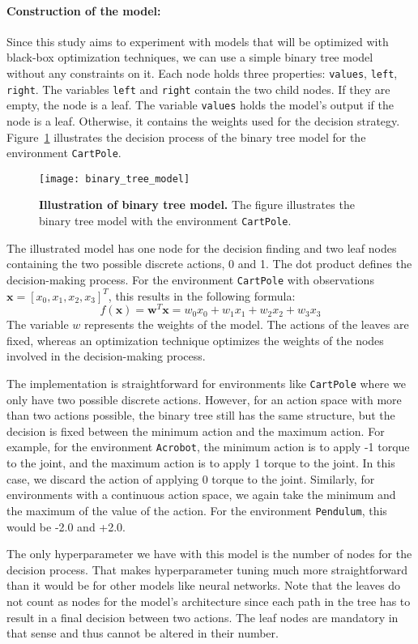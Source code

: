 \paragraph*{Construction of the model:} Since this study aims to experiment with models that will be optimized with black-box optimization techniques, we can use a simple binary tree model without any constraints on it. Each node holds three properties: \verb|values|, \verb|left|, \verb|right|. The variables \verb|left| and \verb|right| contain the two child nodes. If they are empty, the node is a leaf. The variable \verb|values| holds the model's output if the node is a leaf. Otherwise, it contains the weights used for the decision strategy. Figure~\ref{fig:binary_tree_model_illustration} illustrates the decision process of the binary tree model for the environment \verb|CartPole|.
\begin{figure}[!ht]
\centering
\texttt{[image: binary\_tree\_model]}
\caption[Illustration of binary tree model]{
  \textbf{Illustration of binary tree model.}
  The figure illustrates the binary tree model with the environment \texttt{CartPole}.
}
\label{fig:binary_tree_model_illustration}
\end{figure}
The illustrated model has one node for the decision finding and two leaf nodes containing the two possible discrete actions, 0 and 1. The dot product defines the decision-making process. For the environment \verb|CartPole| with observations $\mathbf{x} = [x_0, x_1, x_2, x_3]^T$, this results in the following formula:
\[
  f(\mathbf{x}) = \mathbf{w}^T\mathbf{x} = w_0 x_0 + w_1 x_1 + w_2 x_2 + w_3 x_3
\]
The variable $w$ represents the weights of the model. The actions of the leaves are fixed, whereas an optimization technique optimizes the weights of the nodes involved in the decision-making process.

The implementation is straightforward for environments like \verb|CartPole| where we only have two possible discrete actions. However, for an action space with more than two actions possible, the binary tree still has the same structure, but the decision is fixed between the minimum action and the maximum action. For example, for the environment \verb|Acrobot|, the minimum action is to apply -1 torque to the joint, and the maximum action is to apply 1 torque to the joint. In this case, we discard the action of applying 0 torque to the joint. Similarly, for environments with a continuous action space, we again take the minimum and the maximum of the value of the action. For the environment \verb|Pendulum|, this would be -2.0 and +2.0.

The only hyperparameter we have with this model is the number of nodes for the decision process. That makes hyperparameter tuning much more straightforward than it would be for other models like neural networks. Note that the leaves do not count as nodes for the model's architecture since each path in the tree has to result in a final decision between two actions. The leaf nodes are mandatory in that sense and thus cannot be altered in their number.

